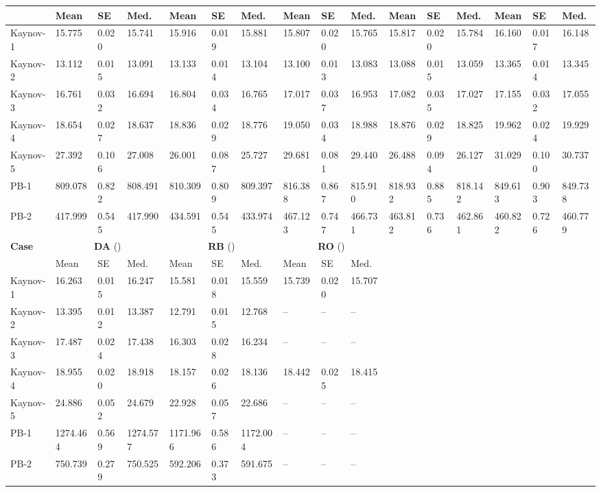 \begin{table}[!htbp]
{\begin{tabular}{l *{5}{lll}}
\cmidrule(lr){2-4}\cmidrule(lr){5-7}\cmidrule(lr){8-10}\cmidrule(lr){11-13}\cmidrule(lr){14-16}
 & Mean & SE & Med. & Mean & SE & Med. & Mean & SE & Med. & Mean & SE & Med. & Mean & SE & Med.\\
\midrule
Kaynov-1 & 15.775 & 0.020 & 15.741 & 15.916 & 0.019 & 15.881 & 15.807 & 0.020 & 15.765 & 15.817 & 0.020 & 15.784 & 16.160 & 0.017 & 16.148 \\
Kaynov-2 & 13.112 & 0.015 & 13.091 & 13.133 & 0.014 & 13.104 & 13.100 & 0.013 & 13.083 & 13.088 & 0.015 & 13.059 & 13.365 & 0.014 & 13.345 \\
Kaynov-3 & 16.761 & 0.032 & 16.694 & 16.804 & 0.034 & 16.765 & 17.017 & 0.037 & 16.953 & 17.082 & 0.035 & 17.027 & 17.155 & 0.032 & 17.055 \\
Kaynov-4 & 18.654 & 0.027 & 18.637 & 18.836 & 0.029 & 18.776 & 19.050 & 0.034 & 18.988 & 18.876 & 0.029 & 18.825 & 19.962 & 0.024 & 19.929 \\
Kaynov-5 & 27.392 & 0.106 & 27.008 & 26.001 & 0.087 & 25.727 & 29.681 & 0.081 & 29.440 & 26.488 & 0.094 & 26.127 & 31.029 & 0.100 & 30.737 \\
PB-1 & 809.078 & 0.822 & 808.491 & 810.309 & 0.809 & 809.397 & 816.388 & 0.867 & 815.910 & 818.932 & 0.885 & 818.142 & 849.613 & 0.903 & 849.738 \\
PB-2 & 417.999 & 0.545 & 417.990 & 434.591 & 0.545 & 433.974 & 467.123 & 0.747 & 466.731 & 463.812 & 0.736 & 462.861 & 460.822 & 0.726 & 460.779 \\
\midrule
\multirow{2}{*}{\textbf{Case}}
& \multicolumn{3}{c}{\textbf{DA} (\citeauthor{rong2017heuristics})}
& \multicolumn{3}{c}{\textbf{RB} (\citeauthor{gallego2007bounds})}
& \multicolumn{3}{c}{\textbf{RO} (\citeauthor{rong2017heuristics})}
& \multicolumn{3}{c}{}
& \multicolumn{3}{c}{}
\\
\cmidrule(lr){2-4}\cmidrule(lr){5-7}\cmidrule(lr){8-10}
 & Mean & SE & Med. & Mean & SE & Med. & Mean & SE & Med. & & & & & &\\
\midrule
Kaynov-1 & 16.263 & 0.015 & 16.247 & 15.581 & 0.018 & 15.559 & 15.739 & 0.020 & 15.707 &  & & &  & & \\
Kaynov-2 & 13.395 & 0.012 & 13.387 & 12.791 & 0.015 & 12.768 & -- & -- & -- &  & & &  & & \\
Kaynov-3 & 17.487 & 0.024 & 17.438 & 16.303 & 0.028 & 16.234 & -- & -- & -- &  & & &  & & \\
Kaynov-4 & 18.955 & 0.020 & 18.918 & 18.157 & 0.026 & 18.136 & 18.442 & 0.025 & 18.415 &  & & &  & & \\
Kaynov-5 & 24.886 & 0.052 & 24.679 & 22.928 & 0.057 & 22.686 & -- & -- & -- &  & & &  & & \\
PB-1 & 1274.464 & 0.569 & 1274.577 & 1171.966 & 0.586 & 1172.004 & -- & -- & -- &  & & &  & & \\
PB-2 & 750.739 & 0.279 & 750.525 & 592.206 & 0.373 & 591.675 & -- & -- & -- &  & & &  & & \\
\bottomrule
\end{tabular}
}
\end{table}
